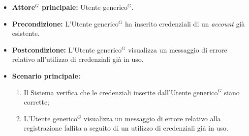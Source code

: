 \label{usecase:Errore registrazione account esistente}
\begin{itemize}

	\item \textbf{\gls{Attore}$^G$ principale:} \gls{Utente generico}$^G$.

	\item \textbf{Precondizione:} L'\gls{Utente generico}$^G$ ha inserito credenziali di un \textit{account} già esistente.

	\item \textbf{Postcondizione:} L'\gls{Utente generico}$^G$ visualizza un messaggio di errore relativo all'utilizzo di credenziali già in uso.

	\item \textbf{Scenario principale:}
	\begin{enumerate}
        \item Il Sistema verifica che le credenziali inserite dall'\gls{Utente generico}$^G$ siano corrette;
        \item L'\gls{Utente generico}$^G$ visualizza un messaggio di errore relativo alla registrazione fallita a seguito di un utilizzo di credenziali già in uso.
	\end{enumerate}
	
\end{itemize}